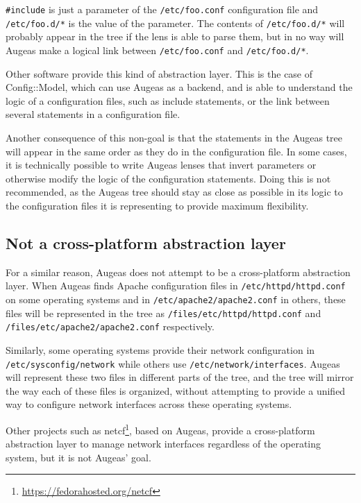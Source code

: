 \verb!#include! is just a parameter of the \nolinkurl{/etc/foo.conf} configuration file and \nolinkurl{/etc/foo.d/*} is the value of the parameter. The contents of \nolinkurl{/etc/foo.d/*} will probably appear in the tree if the lens is able to parse them, but in no way will Augeas make a logical link between \nolinkurl{/etc/foo.conf} and \nolinkurl{/etc/foo.d/*}.

Other software provide this kind of abstraction layer. This is the case of Config::Model, which can use Augeas as a backend, and is able to understand the logic of a configuration files, such as include statements, or the link between several statements in a configuration file.

Another consequence of this non-goal is that the statements in the Augeas tree will appear in the same order as they do in the configuration file. In some cases, it is technically possible to write Augeas lenses that invert parameters or otherwise modify the logic of the configuration statements. Doing this is not recommended, as the Augeas tree should stay as close as possible in its logic to the configuration files it is representing to provide maximum flexibility.

\subsection{Not a cross-platform abstraction layer}

For a similar reason, Augeas does not attempt to be a cross-platform abstraction layer. When Augeas finds Apache configuration files in \nolinkurl{/etc/httpd/httpd.conf} on some operating systems and in \nolinkurl{/etc/apache2/apache2.conf} in others, these files will be represented in the tree as \nolinkurl{/files/etc/httpd/httpd.conf} and \nolinkurl{/files/etc/apache2/apache2.conf} respectively.

Similarly, some operating systems provide their network configuration in \nolinkurl{/etc/sysconfig/network} while others use \nolinkurl{/etc/network/interfaces}. Augeas will represent these two files in different parts of the tree, and the tree will mirror the way each of these files is organized, without attempting to provide a unified way to configure network interfaces across these operating systems.

Other projects such as netcf\footnote{\url{https://fedorahosted.org/netcf}}, based on Augeas, provide a cross-platform abstraction layer to manage network interfaces regardless of the operating system, but it is not Augeas' goal.

